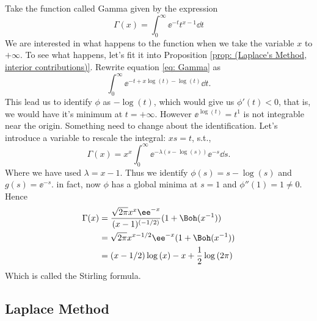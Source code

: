 \begin{exemplo}
	Take the function called Gamma given by the expression
	\begin{equation}
		\Gamma(x) = \int_{0}^{\infty} \ee^{-t} t^{x-1} \dd t
		\label{eq: Gamma}
	\end{equation}
	We are interested in what happens to the function when we take the variable $x$ to $+\infty$. To see what happens, let's fit it into Proposition \ref{prop: (Laplace's Method, interior contributions)}. Rewrite equation \ref{eq: Gamma} as
	\begin{equation}
		\int_{0}^{\infty} \ee^{-t+x\log{(t)}-\log{(t)}} \dd t.
	\end{equation} 
	This lead us to identify $\phi$ as $-\log{(t)}$, which would give us $\phi'(t) < 0$, that is, we would have it's minimum at $t=+\infty$. However $\ee^{\log{(t)}} = t^1$ is not integrable near the origin. Something need to change about the identification. Let's introduce a variable to rescale the integral: $xs = t$, s.t.,
	\begin{equation}
		\Gamma(x) = x^x \int_{0}^{\infty} \ee^{-\lambda(s - \log{(s)})} \ee^{-s} \dd s.
	\end{equation}
	Where we have used $\lambda = x - 1$. Thus we identify $\phi(s) = s - \log(s)$ and $g(s) = \ee^{-s}$. in fact, now $\phi$ has a global minima at $s = 1$ and $\phi''(1) = 1 \neq 0$. Hence
	\begin{align}
		\Gamma(x) & = \frac{\sqrt{2\pi} x^x \ee^{-x}}{(x-1)^{(-1/2)}} (1 + \Boh(x^{-1})) \\
		& = \sqrt{2\pi} x^{x - 1/2} \ee^{-x} (1 + \Boh(x^{-1})) \\
		& = (x-1/2)\log{(x)} - x + \frac{1}{2} \log{(2\pi)}
	\end{align}
	Which is called the Stirling formula.
\end{exemplo}

\subsection{Laplace Method}

